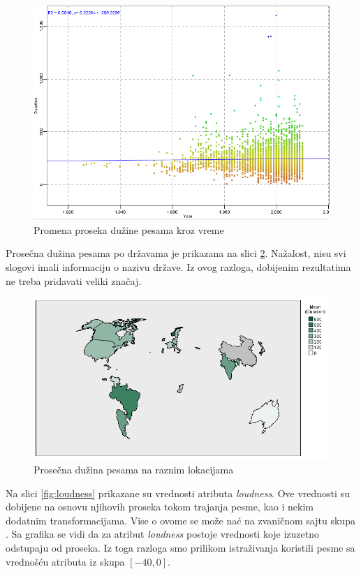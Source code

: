 \begin{figure}[H]
    \centering
    \includegraphics[scale=0.5]{resources/year-duration.PNG}
    \caption{Promena proseka du\v{z}ine pesama kroz vreme}
    \label{fig:YearDurationAvg}
\end{figure}


Prose\v{c}na du\v{z}ina pesama po dr\v{z}avama je prikazana na slici \ref{fig:CountryDuration}. Na\v{z}alost, nisu svi slogovi imali informaciju o nazivu dr\v{z}ave. Iz ovog razloga, dobijenim rezultatima ne treba pridavati veliki zna\v{c}aj.

\begin{figure}[H]
    \centering
    \includegraphics[scale=0.45]{resources/country-duration.png}
    \caption{Prose\v{c}na du\v{z}ina pesama na raznim lokacijama}
    \label{fig:CountryDuration}
\end{figure}


Na slici \ref{fig:loudness} prikazane su vrednosti atributa \emph{loudness}. Ove vrednosti su dobijene na osnovu njihovih proseka tokom trajanja pesme, kao i nekim dodatnim transformacijama. Vise o ovome se mo\v{z}e na\'c{} na zvani\v{c}nom sajtu skupa \cite{Dataset}. Sa grafika se vidi da za atribut \emph{loudness} postoje vrednosti koje izuzetno odstupaju od proseka. Iz toga razloga smo prilikom istra\v{z}ivanja koristili pesme sa vredno\v{s}\'c{}u atributa iz skupa $[-40, 0]$.

